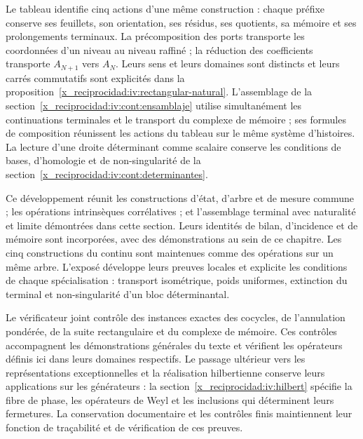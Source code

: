 Le tableau identifie cinq actions d’une même construction : chaque
préfixe conserve ses feuillets, son orientation, ses résidus, ses quotients, sa mémoire
et ses prolongements terminaux. La précomposition des ports transporte les
coordonnées d’un niveau au niveau raffiné ; la réduction des coefficients
transporte \(A_{N+1}\) vers \(A_N\). Leurs sens et leurs domaines sont
distincts et leurs carrés commutatifs sont explicités dans la
proposition~\ref{x_reciprocidad:iv:rectangular-natural}. L’assemblage de la
section~\ref{x_reciprocidad:iv:cont:ensamblaje} utilise simultanément les
continuations terminales et le transport du complexe de mémoire ;
ses formules de composition réunissent les actions du tableau sur le
même système d’histoires. La lecture d’une droite déterminant
comme scalaire conserve les conditions de bases, d’homologie et de
non-singularité de la section~\ref{x_reciprocidad:iv:cont:determinantes}.

Ce développement réunit les constructions d'état, d'arbre et de mesure commune ; les opérations intrinsèques corrélatives ; et l'assemblage terminal avec naturalité et limite démontrées dans cette section. Leurs identités de bilan, d'incidence et de mémoire sont incorporées, avec des démonstrations au sein de ce chapitre. Les cinq constructions du continu sont maintenues comme des opérations sur un même arbre. L'exposé développe leurs preuves locales et explicite les conditions de chaque spécialisation : transport isométrique, poids uniformes, extinction du terminal et non-singularité d'un bloc déterminantal.

Le vérificateur joint contrôle des instances exactes des cocycles, de l’annulation pondérée, de la suite rectangulaire et du complexe de mémoire. Ces contrôles accompagnent les démonstrations générales du texte et vérifient les opérateurs définis ici dans leurs domaines respectifs. Le passage ultérieur vers les représentations exceptionnelles et la réalisation hilbertienne conserve leurs applications sur les générateurs : la section~\ref{x_reciprocidad:iv:hilbert} spécifie la fibre de phase, les opérateurs de Weyl et les inclusions qui déterminent leurs fermetures. La conservation documentaire et les contrôles finis maintiennent leur fonction de traçabilité et de vérification de ces preuves.
